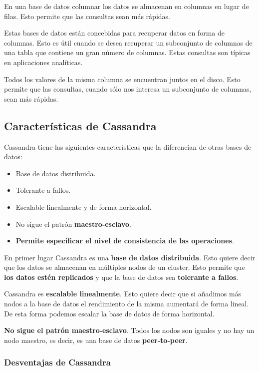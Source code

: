 \documentclass[
]{book}
\providecommand{\tightlist}{%
  \setlength{\itemsep}{0pt}\setlength{\parskip}{0pt}}
\begin{document}
En una base de datos columnar los datos se almacenan en columnas en lugar de filas. Esto permite que las consultas sean más rápidas.

Estas bases de datos están concebidas para recuperar datos en forma de columnas. Esto es útil cuando se desea recuperar un subconjunto de columnas de una tabla que contiene un gran número de columnas. Estas consultas son típicas en aplicaciones analíticas.

Todos los valores de la misma columna se encuentran juntos en el disco. Esto permite que las consultas, cuando sólo nos interesa un subconjunto de columnas, sean más rápidas.

\subsection{Características de Cassandra}\label{caracteruxedsticas-de-cassandra}

Cassandra tiene las siguientes características que la diferencian de otras bases de datos:

\begin{itemize}
\tightlist
\item
  Base de datos distribuida.
\item
  Tolerante a fallos.
\item
  Escalable linealmente y de forma horizontal.
\item
  No sigue el patrón \textbf{maestro-esclavo}.
\item
  \textbf{Permite especificar el nivel de consistencia de las operaciones}.
\end{itemize}

En primer lugar Cassandra es una \textbf{base de datos distribuida}. Esto quiere decir que los datos se almacenan en múltiples nodos de un cluster. Esto permite que \textbf{los datos estén replicados} y que la base de datos sea \textbf{tolerante a fallos}.

Cassandra es \textbf{escalable linealmente}. Esto quiere decir que si añadimos más nodos a la base de datos el rendimiento de la misma aumentará de forma lineal. De esta forma podemos escalar la base de datos de forma horizontal.

\textbf{No sigue el patrón maestro-esclavo}. Todos los nodos son iguales y no hay un nodo maestro, es decir, es una base de datos \textbf{peer-to-peer}.

\subsubsection{Desventajas de Cassandra}\label{desventajas-de-cassandra}
\end{document}
